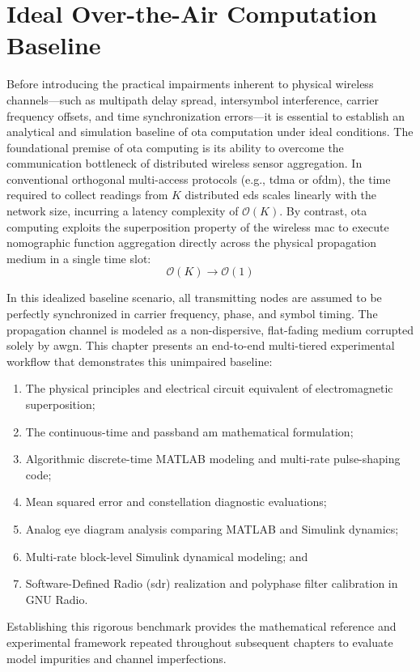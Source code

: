 \documentclass[Markos_Delaportas_1316.tex]{subfiles}
\begin{document}
\section{Ideal Over-the-Air Computation Baseline}
\label{sec:ideal_ota_baseline}
Before introducing the practical impairments inherent to physical
wireless channels—such as
multipath delay spread, intersymbol interference, carrier frequency
offsets, and time
synchronization errors—it is essential to establish an analytical and
simulation baseline of
\gls{ota} computation under ideal conditions. The foundational
premise of \gls{ota}
computing is its ability to overcome the communication bottleneck of
distributed wireless sensor
aggregation. In conventional orthogonal multi-access protocols (e.g.,
\gls{tdma} or \gls{ofdm}),
the time required to collect readings from $K$ distributed \gls{ed}s
scales linearly with the
network size, incurring a latency complexity of $\mathcal{O}(K)$. By
contrast, \gls{ota} computing
exploits the superposition property of the wireless \gls{mac} to
execute nomographic function
aggregation directly across the physical propagation medium in a
single time slot:
\begin{equation}
    \mathcal{O}(K) \longrightarrow \mathcal{O}(1)
    \label{eq:ota_latency_complexity}
\end{equation}

In this idealized baseline scenario, all transmitting nodes are
assumed to be perfectly synchronized
in carrier frequency, phase, and symbol timing. The propagation
channel is modeled as a non-dispersive,
flat-fading medium corrupted solely by \gls{awgn}. This chapter
presents an end-to-end multi-tiered
experimental workflow that demonstrates this unimpaired baseline:
\begin{enumerate}[label=(\roman*)]
    \item The physical principles and electrical circuit equivalent
        of electromagnetic superposition;
    \item The continuous-time and passband \gls{am} mathematical formulation;
    \item Algorithmic discrete-time MATLAB modeling and multi-rate
        pulse-shaping code;
    \item Mean squared error and constellation diagnostic evaluations;
    \item Analog eye diagram analysis comparing MATLAB and Simulink dynamics;
    \item Multi-rate block-level Simulink dynamical modeling; and
    \item Software-Defined Radio (\gls{sdr}) realization and
        polyphase filter calibration in GNU Radio.
\end{enumerate}
Establishing this rigorous benchmark provides the mathematical
reference and experimental framework
repeated throughout subsequent chapters to evaluate model impurities
and channel imperfections.
\end{document}
